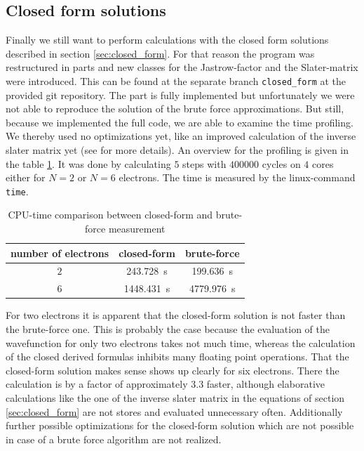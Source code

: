 \subsection{Closed form solutions}\label{sec:closed_form_eval}
Finally we still want to perform calculations with the closed form solutions described in section \ref{sec:closed_form}. For that reason the program was restructured in parts and new classes for the Jastrow-factor and the Slater-matrix were introduced. This can be found at the separate branch \texttt{closed\_form} at the provided git repository. The part is fully implemented but unfortunately we were not able to reproduce the solution of the brute force approximations. But still, because we implemented the full code, we are able to examine the time profiling. We thereby used no optimizations yet, like an improved calculation of the inverse slater matrix yet (see \citet{hogberget2013} for more details). An overview for the profiling is given in the table \ref{tab:cpu-time}. It was done by calculating $5$ steps with $400000$ cycles on $4$ cores either for $N=2$ or $N=6$ electrons. The time is measured by the linux-command \texttt{time}.
 \begin{table}[htbp]
    \centering
    \caption{CPU-time comparison between closed-form and brute-force measurement}
    \begin{tabular}{c|cc}
    \toprule
    number of electrons   & closed-form    & brute-force   \\
    \midrule
    $2$     & \SI{243.728}{\second}   & \SI{199.636}{\second}  \\
    $6$     & \SI{1448.431}{\second}  & \SI{4779.976}{\second}  \\
    \bottomrule
    \end{tabular}
    \label{tab:cpu-time}
\end{table}

For two electrons it is apparent that the closed-form solution is not faster than the brute-force one. This is probably the case because the evaluation of the wavefunction for only two electrons takes not much time, whereas the calculation of the closed derived formulas inhibits many floating point operations. That the closed-form solution makes sense shows up clearly for six electrons. There the calculation is by a factor of approximately $3.3$ faster, although elaborative calculations like the one of the inverse slater matrix in the equations of section \ref{sec:closed_form} are not stores and evaluated unnecessary often. Additionally further possible optimizations for the closed-form solution which are not possible in case of a brute force algorithm are not realized. 

